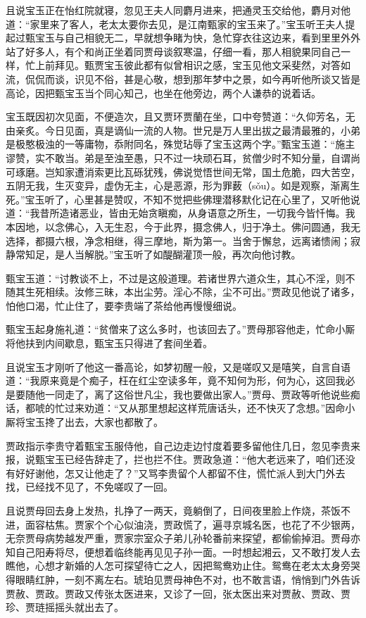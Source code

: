 \documentclass[12pt,oneside]{book}
\begin{document}
且说宝玉正在怡红院就寝，忽见王夫人同麝月进来，把通灵玉交给他，麝月对他道：“家里来了客人，老太太要你去见，是江南甄家的宝玉来了。”宝玉听王夫人提起过甄宝玉与自己相貌无二，早就想争睹为快，急忙穿衣往这边来，看到里里外外站了好多人，有个和尚正坐着同贾母谈叙寒温，仔细一看，那人相貌果同自己一样，忙上前拜见。甄贾宝玉彼此都有似曾相识之感，宝玉见他文采斐然，对答如流，侃侃而谈，识见不俗，甚是心敬，想到那年梦中之景，如今再听他所谈又皆是高论，因把甄宝玉当个同心知己，也坐在他旁边，两个人谦恭的说着话。

宝玉既因初次见面，不便造次，且又贾环贾蘭在坐，口中夸赞道：“久仰芳名，无由亲炙。今日见面，真是谪仙一流的人物。世兄是万人里出拔之最清最雅的，小弟是极憨极浊的一等庸物，忝附同名，殊觉玷辱了宝玉这两个字。”甄宝玉道：“施主谬赞，实不敢当。弟是至浊至愚，只不过一块顽石耳，贫僧少时不知分量，自谓尚可琢磨。岂知家遭消索更比瓦砾犹残，佛说觉悟世间无常，国土危脆，四大苦空，五阴无我，生灭变异，虚伪无主，心是恶源，形为罪薮（sǒu）。如是观察，渐离生死。”宝玉听了，心里甚是赞叹，不知不觉把些佛理潜移默化记在心里了，又听他说道：“我昔所造诸恶业，皆由无始贪瞋痴，从身语意之所生，一切我今皆忏悔。我本因地，以念佛心，入无生忍，今于此界，摄念佛人，归于净土。佛问圆通，我无选择，都摄六根，净念相继，得三摩地，斯为第一。当舍于懈怠，远离诸愦闹；寂静常知足，是人当解脱。”宝玉听了如醍醐灌顶一般，再次向他讨教。

甄宝玉道：“讨教谈不上，不过是这般道理。若诸世界六道众生，其心不淫，则不随其生死相续。汝修三昧，本出尘劳。淫心不除，尘不可出。”贾政见他说了诸多，怕他口渴，忙止住了，要李贵端了茶给他再慢慢细说。

甄宝玉起身施礼道：“贫僧来了这么多时，也该回去了。”贾母那容他走，忙命小厮将他扶到内间歇息，甄宝玉只得进了套间坐着。

且说宝玉才刚听了他这一番高论，如梦初醒一般，又是嗟叹又是嘻笑，自言自语道：“我原来竟是个痴子，枉在红尘空读多年，竟不知何为形，何为心，这回我必是要随他一同走了，离了这俗世凡尘，我也要做出家人。”贾母、贾政等听他说些痴话，都唬的忙过来劝道：“又从那里想起这样荒唐话头，还不快灭了念想。”因命小厮将宝玉搀了出去，大家也都散了。

贾政指示李贵守着甄宝玉服侍他，自己边走边忖度着要多留他住几日，忽见李贵来报，说甄宝玉已经告辞走了，拦也拦不住。贾政急道：“他大老远来了，咱们还没有好好谢他，怎又让他走了？”又骂李贵留个人都留不住，慌忙派人到大门外去找，已经找不见了，不免嗟叹了一回。

且说贾母回去身上发热，扎挣了一两天，竟躺倒了，日间夜里脸上作烧，茶饭不进，面容枯焦。贾家个个心似油浇，贾政慌了，遍寻京城名医，也花了不少银两，无奈贾母病势越发严重，贾家宗室众子弟儿孙轮番前来探望，都偷偷掉泪。贾母亦知自己阳寿将尽，便想着临终能再见见子孙一面。一时想起湘云，又不敢打发人去瞧他，心想才新婚的人怎可探望待亡之人，因把鸳鸯劝止住。鸳鸯在老太太身旁哭得眼睛红肿，一刻不离左右。琥珀见贾母神色不对，也不敢言语，悄悄到门外告诉贾赦、贾政。贾政又传张太医进来，又诊了一回，张太医出来对贾赦、贾政、贾珍、贾琏摇摇头就出去了。
\end{document}
